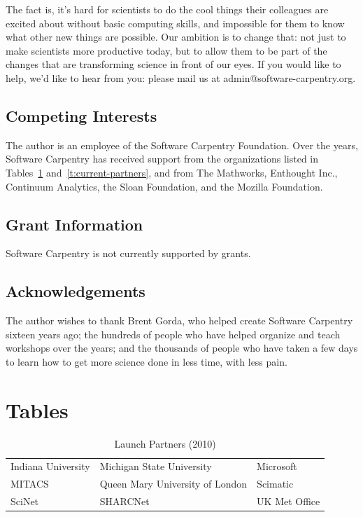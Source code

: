 \documentclass[10pt,a4paper,twocolumn]{article}
\begin{document}
The fact is, it's hard for scientists to do the cool things their
colleagues are excited about without basic computing skills, and
impossible for them to know what other new things are possible. Our
ambition is to change that: not just to make scientists more productive
today, but to allow them to be part of the changes that are transforming
science in front of our eyes. If you would like to help, we'd like to
hear from you: please mail us at admin@software-carpentry.org.

\subsection*{Competing Interests}

The author is an employee of the Software Carpentry Foundation. Over
the years, Software Carpentry has received support from the
organizations listed in Tables~\ref{t:launch-partners}
and~\ref{t:current-partners}, and from The Mathworks, Enthought Inc.,
Continuum Analytics, the Sloan Foundation, and the Mozilla Foundation.

\subsection*{Grant Information}

Software Carpentry is not currently supported by grants.

\subsection*{Acknowledgements}

The author wishes to thank Brent Gorda, who helped create Software
Carpentry sixteen years ago; the hundreds of people who have helped
organize and teach workshops over the years; and the thousands of
people who have taken a few days to learn how to get more science
done in less time, with less pain.

\nocite{*}
{\small
}

\section*{Tables}

\begin{table}
\centering
\begin{tabular}{lll}
Indiana University & Michigan State University & Microsoft \\
MITACS & Queen Mary University of London & Scimatic \\
SciNet & SHARCNet & UK Met Office
\end{tabular}
\caption{Launch Partners (2010)}
\label{t:launch-partners}
\end{table}
\end{document}
